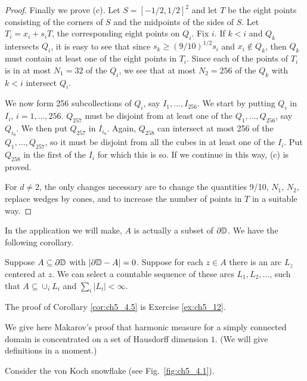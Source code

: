 \begin{proof}
Finally we prove (c). Let $S = [-1/2,1/2]^2$ and let $T$ be the eight points consisting of the corners of $S$ and the midpoints of the sides of $S$. Let $T_i = x_i + s_iT$, the corresponding eight points on $Q_i$. Fix $i$. If $k < i$ and $Q_k$ intersects $Q_i$, it is easy to see that since $s_k \geq (9/10)^{1/2}s_i$ and $x_i \notin Q_k$, then $Q_k$ must contain at least one of the eight points in $T_i$. Since each of the points of $T_i$ is in at most $N_1 = 32$ of the $Q_i$, we see that at most $N_2 = 256$ of the $Q_k$ with $k < i$ intersect $Q_i$.

We now form 256 subcollections of $Q_i$, say $I_1,\ldots,I_{256}$. We start by putting $Q_i$ in $I_i$, $i = 1,\ldots,256$. $Q_{257}$ must be disjoint from at least one of the $Q_1,\ldots,Q_{256}$, say $Q_{i_0}$. We then put $Q_{257}$ in $I_{i_0}$. Again, $Q_{258}$ can intersect at most 256 of the $Q_1,\ldots,Q_{257}$, so it must be disjoint from all the cubes in at least one of the $I_i$. Put $Q_{258}$ in the first of the $I_i$ for which this is so. If we continue in this way, (c) is proved.

For $d \neq 2$, the only changes necessary are to change the quantities 9/10, $N_1$, $N_2$, replace wedges by cones, and to increase the number of points in $T$ in a suitable way.
\end{proof}


In the application we will make, $A$ is actually a subset of $\partial\mathbb{D}$. We have the following corollary.

\begin{corollary}\label{cor:ch5_4.5}
Suppose $A \subseteq \partial\mathbb{D}$ with $|\partial\mathbb{D}-A| = 0$. Suppose for each $z \in A$ there is an arc $L_z$ centered at $z$. We can select a countable sequence of these arcs $L_1,L_2,\ldots$, such that $A \subseteq \cup_i L_i$ and $\sum_i |L_i| < \infty$.
\end{corollary}

The proof of Corollary \ref{cor:ch5_4.5} is Exercise \ref{ex:ch5_12}.


We give here Makarov's proof that harmonic measure for a simply connected domain is concentrated on a set of Hausdorff dimension $1$. (We will give definitions in a moment.)

Consider the von Koch snowflake (see Fig.\ \ref{fig:ch5_4.1}).

